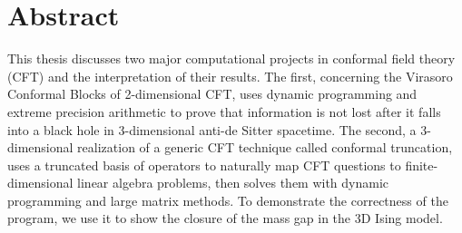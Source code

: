 \chapter*{Abstract}

This thesis discusses two major computational projects in conformal field theory
(CFT) and the interpretation of their results. The first, concerning the 
Virasoro Conformal Blocks of 2-dimensional CFT, uses dynamic programming and 
extreme precision arithmetic to prove that information is not lost after it 
falls into a black hole in 3-dimensional anti-de Sitter spacetime. The second, a
3-dimensional realization of a generic CFT technique called conformal 
truncation, uses a truncated basis of operators to naturally map CFT questions 
to finite-dimensional linear algebra problems, then solves them with dynamic
programming and large matrix methods. To demonstrate the correctness of the 
program, we use it to show the closure of the mass gap in the 3D Ising model.
